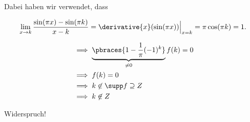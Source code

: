 \begin{solution}
Dabei haben wir verwendet, dass

\begin{align*}
    \lim_{x \to k}
    \frac{\sin(\pi x) - \sin(\pi k)}{x - k}
    =
    \derivative{x}
    (
        \sin(\pi x)
    )
    \Big |_{x=k}
    =
    \pi \cos(\pi k)
    =
    1.
\end{align*}

\begin{align*}
    & \implies
    \underbrace
    {
        \pbraces
        {
            1
            -
            \frac{1}{\pi}
            (-1)^k
        }
    }_{\neq 0}
    f(k)
    =
    0 \\
    & \implies
    f(k) = 0 \\
    & \implies
    k \not \in \supp f \supseteq Z \\
    & \implies
    k \not \in Z
\end{align*}

Widerspruch!

\end{solution}

